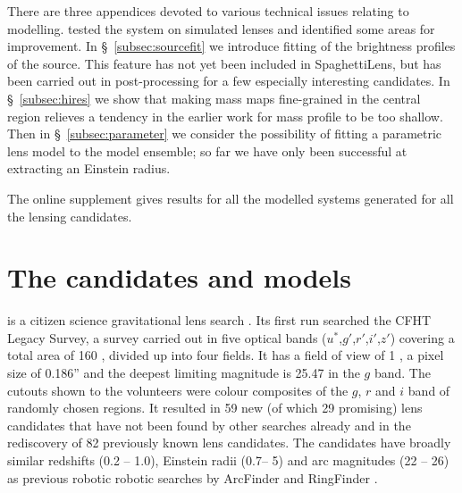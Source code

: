 There are three appendices devoted to various technical issues
relating to modelling.  \cite{2015MNRAS.447.2170K} tested the system
on simulated lenses and identified some areas for improvement.  In
\S~\ref{subsec:sourcefit} we introduce fitting of the brightness
profiles of the source.  This feature has not yet been included in
SpaghettiLens, but has been carried out in post-processing for a few
especially interesting candidates.  In \S~\ref{subsec:hires} we show
that making mass maps fine-grained in the central region relieves a
tendency in the earlier work for mass profile to be too shallow. Then in
\S~\ref{subsec:parameter} we consider the possibility of fitting a
parametric lens model to the model ensemble; so far we have only been
successful at extracting an Einstein radius.

The online supplement gives results for all the modelled systems generated
for all the lensing candidates.




\section{The candidates and models}
\label{sec:candidates_models}

\SW is a citizen science gravitational lens search \citep{2016MNRAS.455.1171M}.
Its first run searched the CFHT Legacy Survey, a survey carried out in five optical bands ($u^*$,$g'$,$r'$,$i'$,$z'$) covering a total area of 160 \sqdeg, divided up into four fields.
It has a field of view of 1 \sqdeg, a pixel size of 0.186'' and the deepest limiting magnitude is 25.47 in the $g$ band\citep{2012AJ....143...38G}.
The cutouts shown to the volunteers were colour composites of the $g$, $r$ and $i$ band of randomly chosen regions.
It resulted in 59 new (of which 29 promising) lens candidates that have not been found by other searches already and in the rediscovery of 82 previously known lens candidates.
The candidates have broadly similar redshifts (0.2 -- 1.0), Einstein radii (0.7\arcsec -- 5\arcsec) and arc magnitudes (22 -- 26) as previous robotic robotic searches by ArcFinder and RingFinder \citep{2016MNRAS.455.1191M}.

